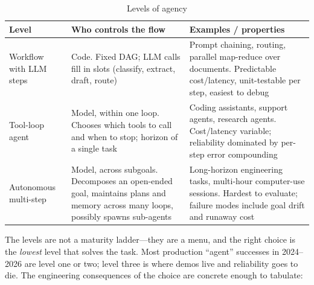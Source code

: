 \begin{table}[H]
\centering
\caption{Levels of agency}
\label{tab:agency_levels}
\begin{tabularx}{\textwidth}{p{3.2cm}XX}
\toprule
\textbf{Level} & \textbf{Who controls the flow} & \textbf{Examples / properties} \\
\midrule
Workflow with LLM steps & Code. Fixed DAG; LLM calls fill in slots (classify, extract, draft, route) & Prompt chaining, routing, parallel map-reduce over documents. Predictable cost/latency, unit-testable per step, easiest to debug \\
Tool-loop agent & Model, within one loop. Chooses which tools to call and when to stop; horizon of a single task & Coding assistants, support agents, research agents. Cost/latency variable; reliability dominated by per-step error compounding \\
Autonomous multi-step & Model, across subgoals. Decomposes an open-ended goal, maintains plans and memory across many loops, possibly spawns sub-agents & Long-horizon engineering tasks, multi-hour computer-use sessions. Hardest to evaluate; failure modes include goal drift and runaway cost \\
\bottomrule
\end{tabularx}
\end{table}

The levels are not a maturity ladder---they are a menu, and the right choice is the \textit{lowest} level that solves the task. Most production ``agent'' successes in 2024--2026 are level one or two; level three is where demos live and reliability goes to die. The engineering consequences of the choice are concrete enough to tabulate:

